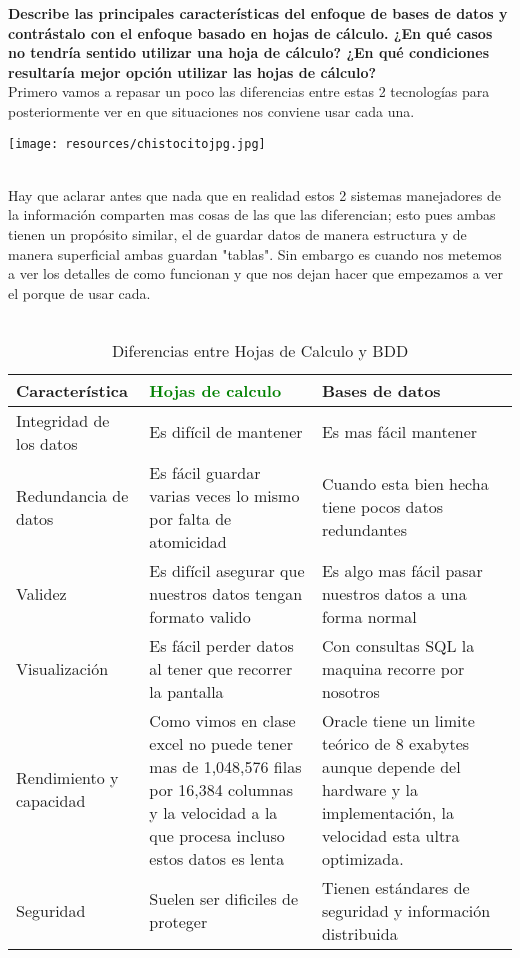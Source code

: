 \textbf{Describe las principales características del enfoque de bases de datos y contrástalo con el
enfoque basado en hojas de cálculo. ¿En qué casos no tendría sentido utilizar una hoja de
cálculo? ¿En qué condiciones resultaría mejor opción utilizar las hojas de cálculo?}\\

Primero vamos a repasar un poco las diferencias entre estas 2 tecnologías para posteriormente ver en que situaciones nos conviene usar cada una.
\begin{center}
    \texttt{[image: resources/chistocitojpg.jpg]}\\
    \cite{RedditPost2020}\\
\end{center}

Hay que aclarar antes que nada que en realidad estos 2 sistemas manejadores de la información comparten mas cosas de las que las diferencian; esto pues ambas tienen un propósito similar, el de guardar datos de manera estructura y de manera superficial ambas guardan "tablas". Sin embargo es cuando nos metemos a ver los detalles de como funcionan y que nos dejan hacer que empezamos a ver el porque de usar cada.\\

\\

\begin{table}[h!]
    \centering
    \begin{tabular}{|p{4cm}||p{5.6cm}||p{5.6cm}|}
        \hline
        \textbf{Característica} &\textcolor{Green}{\textbf{Hojas de calculo}} & \textcolor{bibi}{\textbf{Bases de datos}} \\ \hline 
         Integridad de los datos & Es difícil de mantener & Es mas fácil mantener \\ \hline 
         Redundancia de datos & Es fácil guardar varias veces lo mismo por falta de atomicidad & Cuando esta bien hecha tiene pocos datos redundantes  \\ \hline
         Validez & Es difícil asegurar que nuestros datos tengan formato valido & Es algo mas fácil pasar nuestros datos a una forma normal  \\ \hline
         Visualización & Es fácil perder datos al tener que recorrer la pantalla & Con consultas SQL la maquina recorre por nosotros  \\ \hline 
         Rendimiento y capacidad & Como vimos en clase excel no puede tener mas de 1,048,576 filas por 16,384 columnas y la velocidad a la que procesa incluso estos datos es lenta & Oracle tiene un limite teórico de 8 exabytes aunque depende del hardware y la implementación, la velocidad esta ultra optimizada.  \\ \hline
         Seguridad & Suelen ser dificiles de proteger & Tienen estándares de seguridad y información distribuida  \\ \hline
    \end{tabular}
    \caption{Diferencias entre Hojas de Calculo y BDD \cite{BDDvsXML}}
    \label{tabla:ejemplo}
\end{table}

